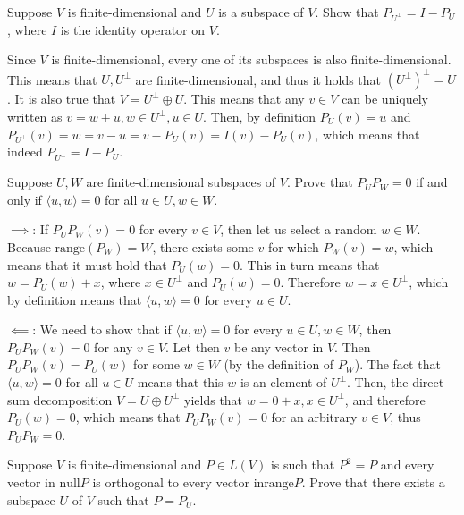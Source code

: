 \begin{exercise}{5}
    Suppose $V$ is finite-dimensional and $U$ is a subspace of $V$. Show that $P_{U^\bot} = I - P_U$, where $I$ is the identity operator on $V$.
\end{exercise}

\begin{solution}

    Since $V$ is finite-dimensional, every one of its subspaces is also finite-dimensional. This means that $U, U^\bot$ are finite-dimensional, and thus it holds that $(U^\bot)^\bot = U$. It is also true that $V = U^\bot \oplus U$. This means that any $v \in V$ can be uniquely written as $v = w + u, w \in U^\bot, u \in U$. Then, by definition $P_U(v) = u$ and $P_{U^\bot}(v) = w = v - u = v - P_U(v) = I(v) - P_U(v)$, which means that indeed $P_{U^\bot} = I - P_U$.
\end{solution}

\begin{exercise}{6}
    Suppose $U, W$ are finite-dimensional subspaces of $V$. Prove that $P_U P_W = 0$ if and only if $\langle u, w \rangle = 0$ for all $u \in U, w \in W$.
\end{exercise}

\begin{solution}

    $\implies$: If $P_U P_W (v) = 0$ for every $v \in V$, then let us select a random $w \in W$. Because $\text{range}(P_W) = W$, there exists some $v$ for which $P_W(v) = w$, which means that it must hold that $P_U(w) = 0$. This in turn means that $w = P_U(w) + x$, where $x \in U^\bot$ and $P_U(w) = 0$. Therefore $w = x \in U^\bot$, which by definition means that $\langle u, w \rangle = 0$ for every $u \in U$.

    $\impliedby$: We need to show that if $\langle u, w \rangle = 0$ for every $u \in U, w \in W$, then $P_U P_W (v) = 0$ for any $v \in V$. Let then $v$ be any vector in $V$. Then $P_U P_W (v) = P_U(w)$ for some $w \in W$ (by the definition of $P_W$). The fact that $\langle u, w \rangle = 0$ for all $u \in U$ means that this $w$ is an element of $U^\bot$. Then, the direct sum decomposition $V = U \oplus U^\bot$ yields that $w = 0 + x, x \in U^\bot$, and therefore $P_U(w) = 0$, which means that $P_U P_W(v) = 0$ for an arbitrary $v \in V$, thus $P_U P_W = 0$.
\end{solution}

\begin{exercise}{7}
    Suppose $V$ is finite-dimensional and $P \in L(V)$ is such that $P^2 = P$ and every vector in $\text{null} P$ is orthogonal to every vector in$\text{range} P$. Prove that there exists a subspace $U$ of $V$ such that $P = P_U$.
\end{exercise}

